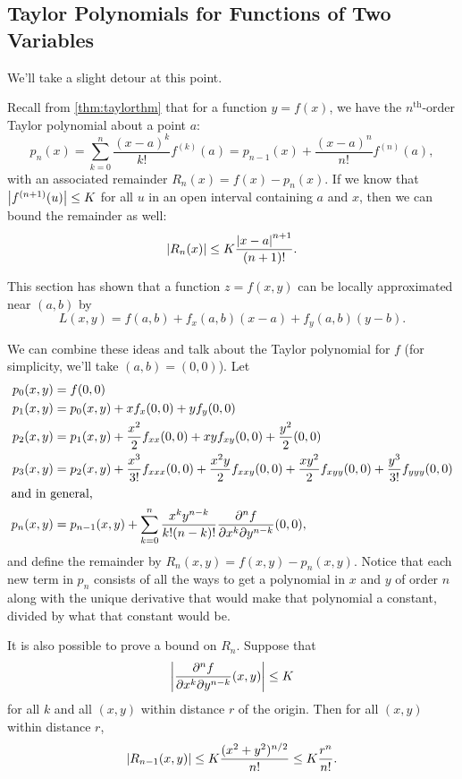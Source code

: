 \subsection{Taylor Polynomials for Functions of Two Variables}

We'll take a slight detour at this point.

Recall from \ref{thm:taylorthm} that for a function $y=f(x)$, we have the $n^{\text{th}}$-order Taylor polynomial about a point $a$:
\[
 p_n(x)
 =\sum_{k=0}^n\frac{(x-a)^k}{k!}f^{(k)}(a)
 =p_{n-1}(x)+\frac{(x-a)^n}{n!}f^{(n)}(a),
\]
with an associated remainder $R_n(x)=f(x)-p_n(x)$.  If we know that $\left\lvert f^{(n+1)}(u) \right\rvert\le K$ for all $u$ in an open interval containing $a$ and $x$, then we can bound the remainder as well:
\[\left\lvert R_n(x) \right\rvert\le K\frac{\left\lvert x-a \right\rvert^{n+1}}{(n+1)!}.\]

This section has shown that a function $z=f(x,y)$ can be locally approximated near $(a,b)$ by
\[ L(x,y)=f(a,b)+f_x(a,b)(x-a)+f_y(a,b)(y-b). \]

We can combine these ideas and talk about the Taylor polynomial for $f$ (for simplicity, we'll take $(a,b)=(0,0)$). Let
\begin{align*}\index{Taylor Series!multivariable}
 p_0(x,y)&=f(0,0) \\
 p_1(x,y)&=p_0(x,y)+xf_x(0,0)+yf_y(0,0) \\
 p_2(x,y)&=p_1(x,y)+\frac{x^2}2f_{xx}(0,0)+xyf_{xy}(0,0)+\frac{y^2}2(0,0) \\
 p_3(x,y)&=p_2(x,y)+\frac{x^3}{3!}f_{xxx}(0,0)+\frac{x^2y}2f_{xxy}(0,0)
 +\frac{xy^2}2f_{xyy}(0,0)+\frac{y^3}{3!}f_{yyy}(0,0) \\
 \intertext{and in general,}
 p_n(x,y)&=p_{n-1}(x,y)+\sum_{k=0}^n\frac{x^k y^{n-k}}{k!(n-k)!}
 \frac{\partial^n f}{\partial x^k\partial y^{n-k}}(0,0),
\end{align*}
and define the remainder by $R_n(x,y)=f(x,y)-p_n(x,y)$. Notice that each new term in $p_n$ consists of all the ways to get a polynomial in $x$ and $y$ of order $n$ along with the unique derivative that would make that polynomial a constant, divided by what that constant would be.

It is also possible to prove a bound on $R_n$.  Suppose that
\[\left\lvert \frac{\partial^n f}{\partial x^k\partial y^{n-k}}(x,y) \right\rvert\le K\]
for all $k$ and all $(x,y)$ within distance $r$ of the origin. Then for all $(x,y)$ within distance $r$,
\[
 \left\lvert R_{n-1}(x,y) \right\rvert
 \le K\frac{(x^2+y^2)^{n/2}}{n!}
 \le K\frac{r^n}{n!}.
\]

